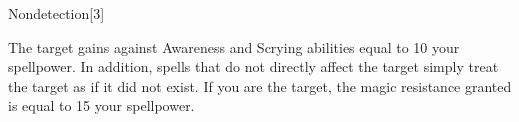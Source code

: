 \begin{spellsection}{Nondetection}[3]
    \begin{spellheader}
    \end{spellheader}
    \begin{spellcontent}
        \begin{spelltargetinginfo}
        \end{spelltargetinginfo}
        \begin{spelleffects}
            \spelleffect The target gains  against Awareness and Scrying abilities equal to 10 \add your spellpower.
            In addition, spells that do not directly affect the target simply treat the target as if it did not exist.
            If you are the target, the magic resistance granted is equal to 15 \add your spellpower.
            \spelldur \durext \dismissable
        \end{spelleffects}
    \end{spellcontent}
    \begin{spellfooter}
    \end{spellfooter}
\end{spellsection}

